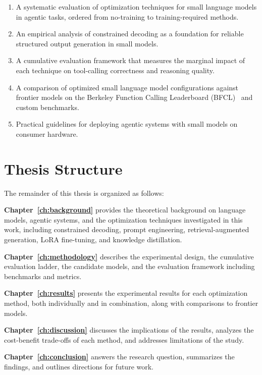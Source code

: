 \begin{enumerate}
    \item A systematic evaluation of optimization techniques for small language models in agentic tasks, ordered from no-training to training-required methods.
    \item An empirical analysis of constrained decoding as a foundation for reliable structured output generation in small models.
    \item A cumulative evaluation framework that measures the marginal impact of each technique on tool-calling correctness and reasoning quality.
    \item A comparison of optimized small language model configurations against frontier models on the Berkeley Function Calling Leaderboard (BFCL)~\cite{bfcl2024} and custom benchmarks.
    \item Practical guidelines for deploying agentic systems with small models on consumer hardware.
\end{enumerate}

\section{Thesis Structure}

The remainder of this thesis is organized as follows:

\textbf{Chapter~\ref{ch:background}} provides the theoretical background on language models, agentic systems, and the optimization techniques investigated in this work, including constrained decoding, prompt engineering, retrieval-augmented generation, LoRA fine-tuning, and knowledge distillation.

\textbf{Chapter~\ref{ch:methodology}} describes the experimental design, the cumulative evaluation ladder, the candidate models, and the evaluation framework including benchmarks and metrics.

\textbf{Chapter~\ref{ch:results}} presents the experimental results for each optimization method, both individually and in combination, along with comparisons to frontier models.

\textbf{Chapter~\ref{ch:discussion}} discusses the implications of the results, analyzes the cost-benefit trade-offs of each method, and addresses limitations of the study.

\textbf{Chapter~\ref{ch:conclusion}} answers the research question, summarizes the findings, and outlines directions for future work.
